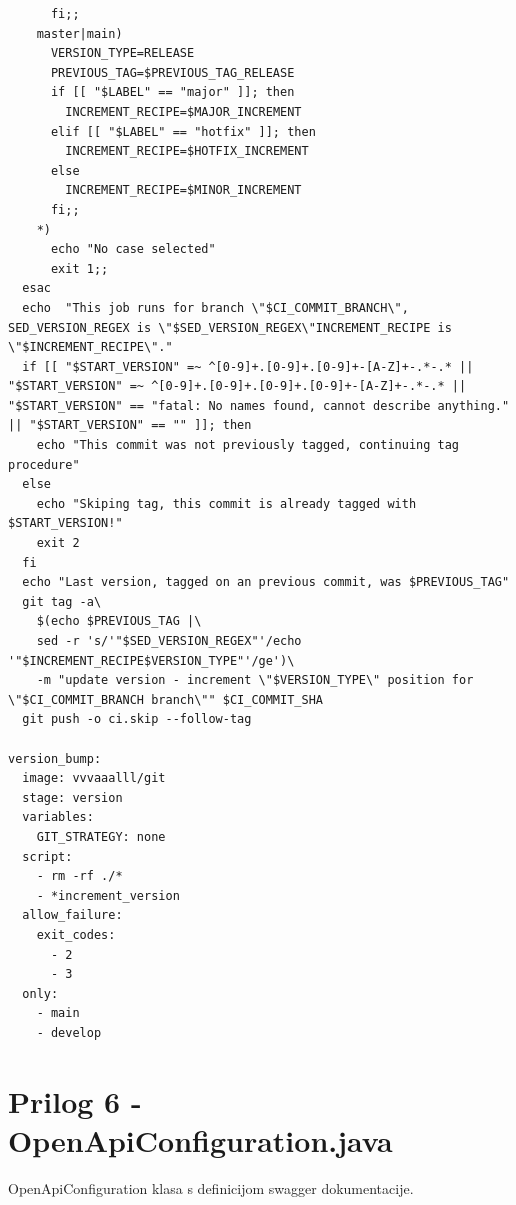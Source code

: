 \documentclass[a4paper,12pt,oneside]{article}
\begin{document}
\begin{lstlisting}
      fi;;
    master|main)
      VERSION_TYPE=RELEASE
      PREVIOUS_TAG=$PREVIOUS_TAG_RELEASE
      if [[ "$LABEL" == "major" ]]; then
        INCREMENT_RECIPE=$MAJOR_INCREMENT
      elif [[ "$LABEL" == "hotfix" ]]; then
        INCREMENT_RECIPE=$HOTFIX_INCREMENT
      else
        INCREMENT_RECIPE=$MINOR_INCREMENT
      fi;;
    *)
      echo "No case selected"
      exit 1;;
  esac
  echo  "This job runs for branch \"$CI_COMMIT_BRANCH\", SED_VERSION_REGEX is \"$SED_VERSION_REGEX\"INCREMENT_RECIPE is \"$INCREMENT_RECIPE\"."
  if [[ "$START_VERSION" =~ ^[0-9]+.[0-9]+.[0-9]+-[A-Z]+-.*-.* || "$START_VERSION" =~ ^[0-9]+.[0-9]+.[0-9]+.[0-9]+-[A-Z]+-.*-.* || "$START_VERSION" == "fatal: No names found, cannot describe anything." || "$START_VERSION" == "" ]]; then
    echo "This commit was not previously tagged, continuing tag procedure"
  else
    echo "Skiping tag, this commit is already tagged with $START_VERSION!"
    exit 2
  fi
  echo "Last version, tagged on an previous commit, was $PREVIOUS_TAG"
  git tag -a\
    $(echo $PREVIOUS_TAG |\
    sed -r 's/'"$SED_VERSION_REGEX"'/echo '"$INCREMENT_RECIPE$VERSION_TYPE"'/ge')\
    -m "update version - increment \"$VERSION_TYPE\" position for \"$CI_COMMIT_BRANCH branch\"" $CI_COMMIT_SHA
  git push -o ci.skip --follow-tag

version_bump:
  image: vvvaaalll/git
  stage: version
  variables:
    GIT_STRATEGY: none
  script:
    - rm -rf ./*
    - *increment_version
  allow_failure:
    exit_codes:
      - 2
      - 3
  only:
    - main
    - develop

\end{lstlisting}

\newpage
\section*{Prilog 6 - OpenApiConfiguration.java}
\label{prilog 6}
OpenApiConfiguration klasa s definicijom swagger dokumentacije.
\end{document}
